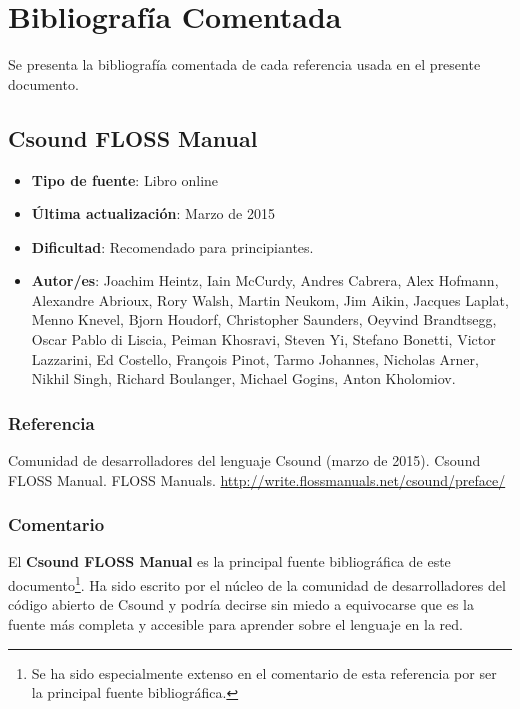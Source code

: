 
\chapter{Bibliografía Comentada}

Se presenta la bibliografía comentada de cada referencia usada en el presente documento.

\section{Csound FLOSS Manual}

 \begin{itemize}
 \item \textbf{Tipo de fuente}: Libro online
 
 \item \textbf{Última actualización}: Marzo de 2015
 
 \item \textbf{Dificultad}: Recomendado para principiantes.
 
 \item \textbf{Autor/es}: Joachim Heintz, Iain McCurdy, Andres Cabrera, Alex Hofmann, Alexandre Abrioux, Rory Walsh, Martin Neukom, Jim Aikin, Jacques Laplat, Menno Knevel, Bjorn Houdorf, Christopher Saunders, Oeyvind Brandtsegg, Oscar Pablo di Liscia, Peiman Khosravi, Steven Yi, Stefano Bonetti, Victor Lazzarini, Ed Costello, François Pinot, Tarmo Johannes, Nicholas Arner, Nikhil Singh, Richard Boulanger, Michael Gogins, Anton Kholomiov.
 \end{itemize}

\subsection{Referencia}

Comunidad de desarrolladores del lenguaje Csound (marzo de 2015). Csound FLOSS Manual. FLOSS Manuals. \url{http://write.flossmanuals.net/csound/preface/}

\subsection{Comentario}

El \textbf{Csound FLOSS Manual} es la principal fuente bibliográfica de este documento\footnote{Se ha sido especialmente extenso en el comentario de esta referencia por ser la principal fuente bibliográfica.}. Ha sido escrito por el núcleo de la comunidad de desarrolladores del código abierto de Csound y podría decirse sin miedo a equivocarse que es la fuente más completa y accesible para aprender sobre el lenguaje en la red.

